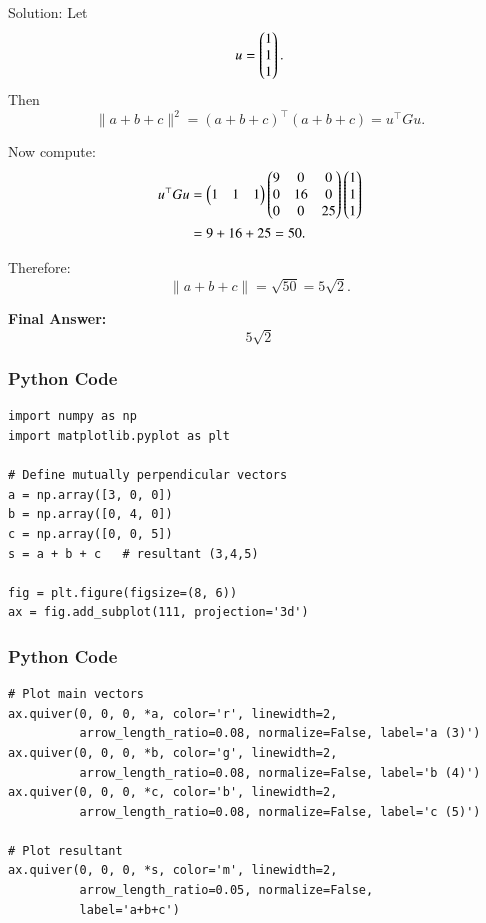\documentclass{beamer}
\begin{document}
\begin{frame}{Solution:}
Let
\[
u = \begin{pmatrix}1 \\ 1 \\ 1\end{pmatrix}.
\]
Then
\begin{equation} \label{eq11}
\|a + b + c\|^2 = (a + b + c)^\top (a + b + c) = u^\top G u.
\end{equation}

Now compute:
\begin{align}
u^\top G u 
&= \begin{pmatrix}1 & 1 & 1\end{pmatrix}
\begin{pmatrix}
9 & 0 & 0 \\
0 & 16 & 0 \\
0 & 0 & 25
\end{pmatrix}
\begin{pmatrix}1 \\ 1 \\ 1\end{pmatrix} \nonumber \\
&= 9 + 16 + 25 = 50. \label{eq12}
\end{align}

Therefore:
\begin{equation} \label{eq13}
\|a + b + c\| = \sqrt{50} = 5\sqrt{2}.
\end{equation}

\bigskip

\textbf{Final Answer:}
\[
\boxed{5\sqrt{2}}
\]
\end{frame}


\begin{frame}[fragile]
    \frametitle{Python Code}
    \begin{lstlisting}
import numpy as np
import matplotlib.pyplot as plt

# Define mutually perpendicular vectors
a = np.array([3, 0, 0])
b = np.array([0, 4, 0])
c = np.array([0, 0, 5])
s = a + b + c   # resultant (3,4,5)

fig = plt.figure(figsize=(8, 6))
ax = fig.add_subplot(111, projection='3d')
\end{lstlisting}
\end{frame}


\begin{frame}[fragile]
    \frametitle{Python Code}
    \begin{lstlisting}
# Plot main vectors
ax.quiver(0, 0, 0, *a, color='r', linewidth=2,
          arrow_length_ratio=0.08, normalize=False, label='a (3)')
ax.quiver(0, 0, 0, *b, color='g', linewidth=2,
          arrow_length_ratio=0.08, normalize=False, label='b (4)')
ax.quiver(0, 0, 0, *c, color='b', linewidth=2,
          arrow_length_ratio=0.08, normalize=False, label='c (5)')

# Plot resultant
ax.quiver(0, 0, 0, *s, color='m', linewidth=2,
          arrow_length_ratio=0.05, normalize=False,
          label='a+b+c')
\end{lstlisting}
\end{frame}
\end{document}
